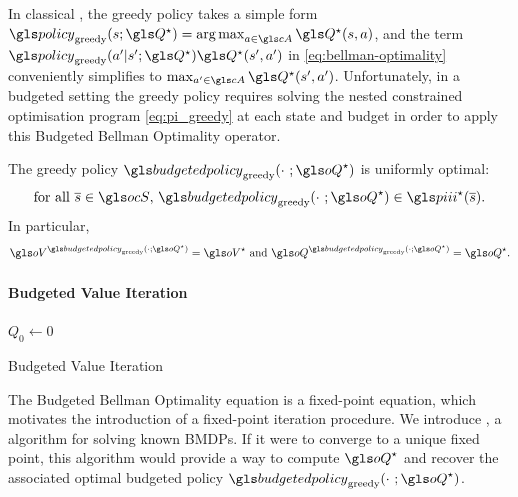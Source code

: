 \begin{remark}
	\begin{leftbar}[remarkbar]
	\label{rmk:greedy}
	In classical , the greedy policy takes a simple form $\policy_\text{greedy}(s; \Q^{\star}) = \argmax_{a\in\cA} \Q^{\star}(s, a)$, and the term $\policy_\text{greedy}(a'|s';\Q^{\star}) \Q^{\star}(s', a')$ in \eqref{eq:bellman-optimality} conveniently simplifies to $\max_{a'\in \cA} \Q^{\star}(s', a')$. Unfortunately, in a budgeted setting the greedy policy requires solving the nested constrained optimisation program \eqref{eq:pi_greedy} at each state and budget in order to apply this Budgeted Bellman Optimality operator.
	\end{leftbar}
\end{remark}

\begin{proposition}
	\begin{leftbar}[propositionbar]
	\label{prop:greedy_optimal}
	The greedy policy $\budgetedpolicy_\text{greedy}(\cdot~; \oQ^{\star})$ is {uniformly} optimal: 
	\begin{equation*}
	\text{for all }\os\in\ocS,\,\budgetedpolicy_\text{greedy}(\cdot~; \oQ^{\star})\in\policies^{\star}(\os). 
	\end{equation*}
	In particular, 
	$$\oV^{\budgetedpolicy_\text{greedy}(\cdot; \oQ^{\star})} = \oV^{\star} \text{ and } \oQ^{\budgetedpolicy_\text{greedy}(\cdot; \oQ^{\star})}= \oQ^{\star}.$$
	\end{leftbar}
\end{proposition}

\paragraph{Budgeted Value Iteration}


\begin{algorithm}
	\DontPrintSemicolon
	$Q_{0} \leftarrow 0$\;
	\caption{Budgeted Value Iteration}
	\label{algo:bvi}
\end{algorithm}

The Budgeted Bellman Optimality equation is a fixed-point equation, which motivates the introduction of a fixed-point iteration procedure. We introduce , a  algorithm for solving known \glspl{BMDP}. If it were to converge to a unique fixed point, this algorithm would provide a way to compute $\oQ^{\star}$ and recover the associated optimal budgeted policy $\budgetedpolicy_\text{greedy}(\cdot~; \oQ^{\star})$.


